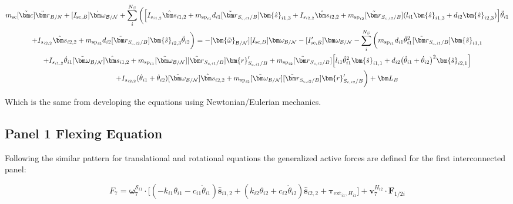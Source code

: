 \documentclass[paper]{aiaaNew}
\begin{document}
\begin{multline} 
m_{\text{sc}} [\tilde{\bm c}] \ddot{\bm r}_{B/N} +[I_{\text{sc},B}] \dot{\bm\omega}_{\cal B/N} + \sum\limits_{i}^{N_S}\bigg(\Big[I_{s_{i1,2}} \hat{\bm s}_{i1,2}+
m_{\text{sp}_{i1}} d_{i1}  [\tilde{{\bm r}}_{S_{c,i1}/B}] \bm{\hat{s}}_{i1,3} +I_{s_{i2,2}} \hat{\bm s}_{i2,2} + m_{\text{sp}_{i2}} [\tilde{{\bm r}}_{S_{c,i2}/B}] (l_{i1} \bm{\hat{s}}_{i1,3} + d_{i2} \bm{\hat{s}}_{i2,3}) \Big] \ddot{\theta}_{i1} \\
+I_{s_{i2,2}}\hat{\bm s}_{i2,2} + m_{\text{sp}_{i2}} d_{i2} [\tilde{{\bm r}}_{S_{c,i2}/B}] \bm{\hat{s}}_{i2,3} \ddot{\theta}_{i2} \bigg)=  -[\bm{\tilde{\omega}}_{\cal B/N}] [I_{\text{sc},B}] \bm\omega_{\cal B/N} - [I'_{\text{sc},B}] \bm\omega_{\cal B/N}
- \sum\limits_{i}^{N_S}\bigg(
 m_{\text{sp}_{i1}} d_{i1} \dot{\theta}_{i1}^2 [\tilde{{\bm r}}_{S_{c,i1}/B}]   \bm{\hat{s}}_{i1,1} \\ 
+I_{s_{i1,2}} \dot{\theta}_{i1} [\tilde{\bm \omega}_{\cal{B/N}}] \hat{\bm s}_{i1,2} + m_{\text{sp}_{i1}} [\tilde{\bm\omega}_{\cal B/N}] [\tilde{{\bm r}}_{S_{c,i1}/B}] \bm{r}'_{S_{c,i1}/B}
+ m_{\text{sp}_{i2}} [\tilde{{\bm r}}_{S_{c,i2}/B}] \Big[ l_{i1} \dot{\theta}_{i1}^2 \bm{\hat{s}}_{i1,1} + d_{i2}\big(\dot{\theta}_{i1} + \dot{\theta}_{i2}\big)^2\bm{\hat{s}}_{i2,1}\Big]\\ 
+I_{s_{i2,2}}  (\dot{\theta}_{i1}  + \dot{\theta}_{i2}) [\tilde{\bm \omega}_{\cal{B/N}}] \hat{\bm s}_{i2,2} + m_{\text{sp}_{i2}} [\tilde{\bm\omega}_{\cal B/N}] [\tilde{{\bm r}}_{S_{c,i2}/B}] \bm{r}'_{S_{c,i2}/B} \bigg) + \bm L_B
\end{multline}

Which is the same from developing the equations using Newtonian/Eulerian mechanics.

\subsection{Panel 1 Flexing Equation}
Following the similar pattern for translational and rotational equations the generalized active forces are defined for the first interconnected panel:

\begin{equation}
F_{7} = \bm \omega_{7}^{\mathcal{S}_{i1}} \cdot \Big[ (-k_{i1} \theta_{i1} - c_{i1} \dot{\theta}_{i1})\bm{\hat{s}}_{i1,2} + (k_{i2} \theta_{i2} + c_{i2} \dot{\theta}_{i2})\bm{\hat{s}}_{i2,2} + \bm \tau_{\text{ext}_{i1},H_{i1}} \Big] + \bm v^{H_{i2}}_{7} \cdot \bm F_{1/2i}
\end{equation}
\end{document}
